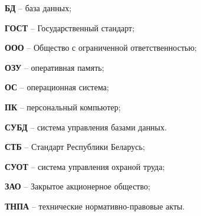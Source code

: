 \par \textbf{БД} – база данных;
\par \textbf{ГОСТ} – Государственный стандарт;
\par \textbf{ООО} – Общество с ограниченной ответственностью;
\par \textbf{ОЗУ} – оперативная память;
\par \textbf{ОС} – операционная система;
\par \textbf{ПК} – персональный компьютер;
\par \textbf{СУБД} – система управления базами данных.
\par \textbf{СТБ} – Стандарт Республики Беларусь;
\par \textbf{СУОТ} – система управления охраной труда;
\par \textbf{ЗАО} – Закрытое акционерное общество;
\par \textbf{ТНПА} – технические нормативно-правовые акты.